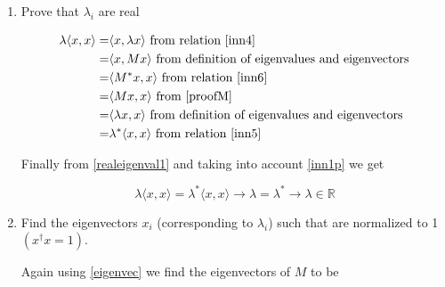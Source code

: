 \documentclass[11pt,letterpaper]{article}%
\newcommand\abs[1]{\left|#1\right|}
\newcommand\inn[2]{\langle#1,#2\rangle}
\begin{document}
\begin{enumerate}[label=\Large{\textbf{\arabic*.}}]
{\begin{enumerate}[label=\textit{\roman*.}]
{Now using \eqref{eigenval} we find the eigenvalues for $M$ to be
\renewcommand\theequation{\arabic{equation}}
\setcounter{equation}{4}

\begin{equation}
\label{eigenvalues}
\begin{split}
\lambda_1 =& \frac{m_1 + m_2}{2} + \sqrt{\frac{(m_1 + m_2)^2}{4} - \left( m_1m_2 - \abs{a}^2 \right)}\\
\lambda_2 =& \frac{m_1 + m_2}{2} - \sqrt{\frac{(m_1 + m_2)^2}{4} - \left( m_1m_2 - \abs{a}^2 \right)}
\end{split}
\end{equation}
}

\item{
Prove that $\lambda_i$ are real

\begin{equation}
\label{realeigenval1}
\begin{split}
\lambda\inn{x}{x} =& \inn{x}{\lambda x}\text{ from relation \eqref{inn4}}\\
=& \inn{x}{Mx}\text{ from definition of eigenvalues and eigenvectors}\\
=& \inn{M^*x}{x}\text{ from relation \eqref{inn6}}\\
=& \inn{Mx}{x}\text{ from \eqref{proofM}}\\
=& \inn{\lambda x}{x}\text{ from definition of eigenvalues and eigenvectors}\\
=& \lambda^*\inn{x}{x}\text{ from relation \eqref{inn5}}
\end{split}
\end{equation}

Finally from \eqref{realeigenval1} and taking into account \eqref{inn1p} we get

\begin{equation}
\label{realeigenval2}
\lambda\inn{x}{x} = \lambda^*\inn{x}{x} \to \lambda = \lambda^* \to \lambda \in \mathbb{R}
\end{equation}
}

\item{
Find the eigenvectors $x_i$ (corresponding to $\lambda_i$) such that are normalized to 1 $(x^\dag 
x = 1)$.

Again using \eqref{eigenvec} we find the eigenvectors of $M$ to be

}
\end{enumerate}}
\end{enumerate}
\end{document}
